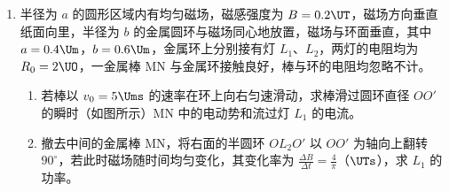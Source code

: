 \documentclass[\gkver]{gaokaozhenti}
\begin{document}
\begin{enumerate}
{从 $T=450\UK$ 升高到 $T_{2}=540\UK$，A 室气体做等容变化，压强为 $p_{A2}$，由查理定律得

$\frac{p_{A}}{T}=\frac{p_{A2}}{T_{2}}$ ④

$p_{A2}=\frac{T_{2}p_{A}}{T}=1.2p_{0}=91.2\UcmHg$ ⑤

$T_{2}=540\UK$ 时，水银高度差为 $15.2\Ucm$。

评分标准：全题 12 分。第（1）小题 4 分，第（2）小题 8 分。其中（1）得出①、②各得 2 分。（2）得出③式，得 3 分；结果正确，得 3 分。得出④、⑤式，各得 1 分；结果正确，得 2 分。
}

\item
半径为 $a$ 的圆形区域内有均匀磁场，磁感强度为 $B=0.2\UT$，磁场方向垂直纸面向里，半径为 $b$ 的金属圆环与磁场同心地放置，磁场与环面垂直，其中 $a=0.4\Um$，$b=0.6\Um$，金属环上分别接有灯 $L_{1}$、$L_{2}$，两灯的电阻均为 $R_{0}=2\UO$，一金属棒 MN 与金属环接触良好，棒与环的电阻均忽略不计。
\begin{enumerate}
	\item
	若棒以 $v_{0}=5\Ums$ 的速率在环上向右匀速滑动，求棒滑过圆环直径 $OO'$ 的瞬时（如图所示）MN 中的电动势和流过灯 $L_{1}$ 的电流。
	\item
	撤去中间的金属棒 MN，将右面的半圆环 $OL_{2}O'$ 以 $OO'$ 为轴向上翻转 $90^{\circ}$，若此时磁场随时间均匀变化，其变化率为 $\frac{\Delta B}{\Delta t}=\frac{4}{\pi}$（$\UTs$），求 $L_{1}$ 的功率。
\end{enumerate}

\onepicture[align=right, h=4.41cm]{}

\end{enumerate}
\end{document}
